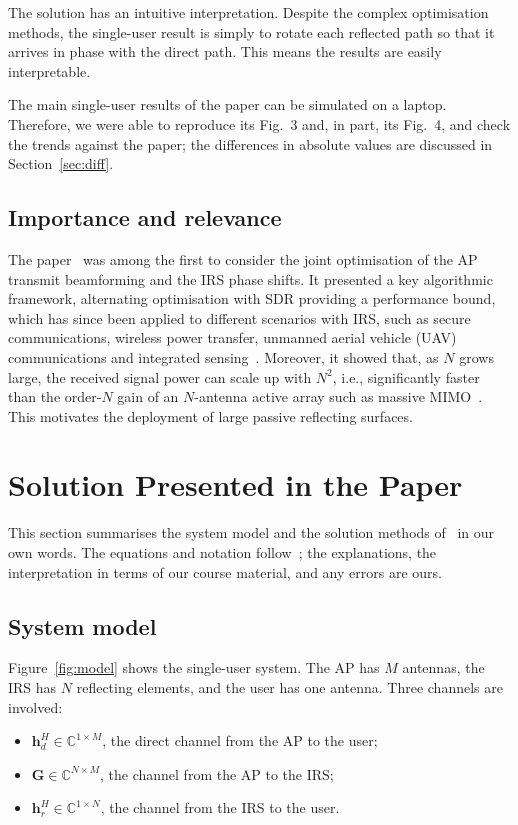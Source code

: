 \documentclass[11pt,a4paper]{article}
\newcommand{\hrv}{\bm{h}_r}
\newcommand{\hdv}{\bm{h}_d}
\newcommand{\Gm}{\bm{G}}
\begin{document}
The solution has an intuitive interpretation. Despite the complex optimisation methods, the single-user
result is simply to rotate each reflected path so that it arrives in phase with the direct path. This
means the results are easily interpretable.

The main single-user results of the paper can be simulated on a laptop. Therefore, we were able to
reproduce its Fig.~3 and, in part, its Fig.~4, and check the trends against the paper; the differences
in absolute values are discussed in Section~\ref{sec:diff}.

\subsection{Importance and relevance}

The paper~\cite{wu} was among the first to consider the joint optimisation of the AP transmit beamforming and
the IRS phase shifts. It presented a key algorithmic framework, alternating optimisation with
SDR providing a performance bound, which has since been applied to different scenarios with IRS, such
as secure communications, wireless power transfer, unmanned aerial vehicle (UAV) communications and integrated
sensing~\cite{wu_mag,wu_tutorial}. Moreover, it showed that, as $N$ grows large, the received signal power can
scale up with $N^2$, i.e., significantly faster than the order-$N$ gain of an $N$-antenna active array
such as massive MIMO~\cite{wu}. This motivates the deployment of large passive reflecting surfaces.

\section{Solution Presented in the Paper}

This section summarises the system model and the solution methods of~\cite{wu} in our own words. The
equations and notation follow~\cite{wu}; the explanations, the interpretation in terms of our course
material, and any errors are ours.

\subsection{System model}

Figure~\ref{fig:model} shows the single-user system. The AP has $M$ antennas, the IRS has $N$
reflecting elements, and the user has one antenna. Three channels are involved:
\begin{itemize}[leftmargin=1.4em,itemsep=2pt]
\item $\hdv^H \in \mathbb{C}^{1\times M}$, the direct channel from the AP to the user;
\item $\Gm \in \mathbb{C}^{N\times M}$, the channel from the AP to the IRS;
\item $\hrv^H \in \mathbb{C}^{1\times N}$, the channel from the IRS to the user.
\end{itemize}
\end{document}
